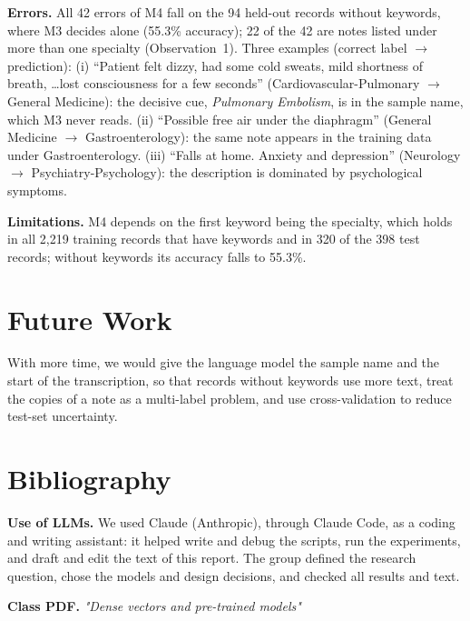 \documentclass[twocolumn,10pt]{article}
\begin{document}
\textbf{Errors.} All 42 errors of M4 fall on the 94 held-out records without keywords, where M3 decides alone (55.3\% accuracy); 22 of the 42 are notes listed under more than one specialty (Observation~1). Three examples (correct label $\rightarrow$ prediction): (i) ``Patient felt dizzy, had some cold sweats, mild shortness of breath, \ldots lost consciousness for a few seconds'' (Cardiovascular-Pulmonary $\rightarrow$ General Medicine): the decisive cue, \emph{Pulmonary Embolism}, is in the sample name, which M3 never reads. (ii) ``Possible free air under the diaphragm'' (General Medicine $\rightarrow$ Gastroenterology): the same note appears in the training data under Gastroenterology. (iii) ``Falls at home. Anxiety and depression'' (Neurology $\rightarrow$ Psychiatry-Psychology): the description is dominated by psychological symptoms.

\textbf{Limitations.} M4 depends on the first keyword being the specialty, which holds in all 2{,}219 training records that have keywords and in 320 of the 398 test records; without keywords its accuracy falls to 55.3\%.

\section{Future Work}

With more time, we would give the language model the sample name and the start of the transcription, so that records without keywords use more text, treat the copies of a note as a multi-label problem, and use cross-validation to reduce test-set uncertainty.

\section*{Bibliography}

 \textbf{   Use of LLMs.} We used Claude (Anthropic), through Claude Code, as a coding and writing assistant: it helped write and debug the scripts, run the experiments, and draft and edit the text of this report. The group defined the research question, chose the models and design decisions, and checked all results and text.

\textbf{Class PDF.} \textit{"Dense vectors and pre-trained models"}
\end{document}

